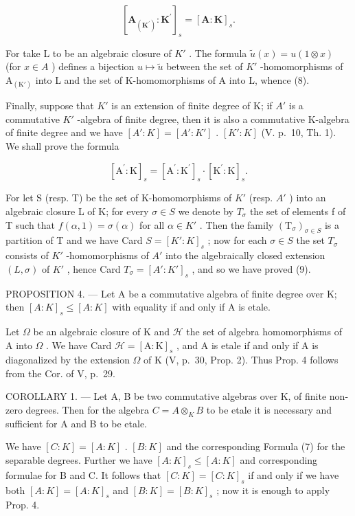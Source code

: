 \[
[ \mathbf {A} _ {(\mathbf {K} ^ {\prime})}: \mathbf {K} ^ {\prime} ] _ {s} = [ \mathbf {A}: \mathbf {K} ] _ {s}.\tag{8}
\]

For take L to be an algebraic closure of \(K'\) . The formula \(\tilde{u}(x)=u(1\otimes x)\) (for \(x\in A\) ) defines a bijection \(u\mapsto\tilde{u}\) between the set of \(K'\) -homomorphisms of \(\mathrm{A}_{(\mathrm{K}')}\) into L and the set of K-homomorphisms of A into L, whence (8).

Finally, suppose that \(K'\) is an extension of finite degree of K; if \(A'\) is a commutative \(K'\) -algebra of finite degree, then it is also a commutative K-algebra of finite degree and we have \([A':K] = [A':K']\) . \([K':K]\) (V. p.~10, Th. 1). We shall prove the formula

\[
[ \mathrm{A} ^ {\prime}: \mathrm{K} ] _ {s} = [ \mathrm{A} ^ {\prime}: \mathrm{K} ^ {\prime} ] _ {s} \cdot [ \mathrm{K} ^ {\prime}: \mathrm{K} ] _ {s}.\tag{9}
\]

For let S (resp. T) be the set of K-homomorphisms of \(K'\) (resp. \(A'\) ) into an algebraic closure L of K; for every \(\sigma \in S\) we denote by \(T_{\sigma}\) the set of elements f of T such that \(f(\alpha, 1) = \sigma(\alpha)\) for all \(\alpha \in K'\) . Then the family \((\mathrm{T}_{\sigma})_{\sigma \in S}\) is a partition of T and we have Card \(S = [K': K]_{s}\) ; now for each \(\sigma \in S\) the set \(T_{\sigma}\) consists of \(K'\) -homomorphisms of \(A'\) into the algebraically closed extension \((L, \sigma)\) of \(K'\) , hence Card \(T_{\sigma} = [A': K']_{s}\) , and so we have proved (9).

PROPOSITION 4. --- Let A be a commutative algebra of finite degree over K; then \([A:K]_{s} \leqslant [A:K]\) with equality if and only if A is etale.

Let \(\Omega\) be an algebraic closure of K and \(\mathcal{H}\) the set of algebra homomorphisms of A into \(\Omega\) . We have Card \(\mathcal{H} = [\mathrm{A}:\mathrm{K}]_s\) , and A is etale if and only if A is diagonalized by the extension \(\Omega\) of K (V, p.~30, Prop. 2). Thus Prop. 4 follows from the Cor. of V, p.~29.

COROLLARY 1. --- Let A, B be two commutative algebras over K, of finite non-zero degrees. Then for the algebra \(C = A \otimes_{K} B\) to be etale it is necessary and sufficient for A and B to be etale.

We have \([C:K]=[A:K]\) . \([B:K]\) and the corresponding Formula (7) for the separable degrees. Further we have \([A:K]_{s}\leqslant[A:K]\) and corresponding formulae for B and C. It follows that \([C:K]=[C:K]_{s}\) if and only if we have both \([A:K]=[A:K]_{s}\) and \([B:K]=[B:K]_{s}\) ; now it is enough to apply Prop. 4.

